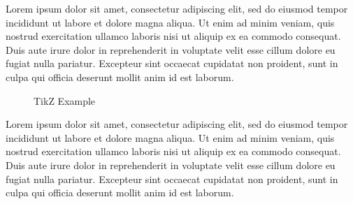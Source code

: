 \documentclass{article}
\begin{document}
Lorem ipsum dolor sit amet, consectetur adipiscing elit, sed do eiusmod tempor incididunt ut labore et dolore magna aliqua. Ut enim ad minim veniam, quis nostrud exercitation ullamco laboris nisi ut aliquip ex ea commodo consequat. Duis aute irure dolor in reprehenderit in voluptate velit esse cillum dolore eu fugiat nulla pariatur. Excepteur sint occaecat cupidatat non proident, sunt in culpa qui officia deserunt mollit anim id est laborum.

\begin{figure}
    \centering
{}
\caption{TikZ Example}
\end{figure}

\newpage

Lorem ipsum dolor sit amet, consectetur adipiscing elit, sed do eiusmod tempor incididunt ut labore et dolore magna aliqua. Ut enim ad minim veniam, quis nostrud exercitation ullamco laboris nisi ut aliquip ex ea commodo consequat. Duis aute irure dolor in reprehenderit in voluptate velit esse cillum dolore eu fugiat nulla pariatur. Excepteur sint occaecat cupidatat non proident, sunt in culpa qui officia deserunt mollit anim id est laborum.
\end{document}
